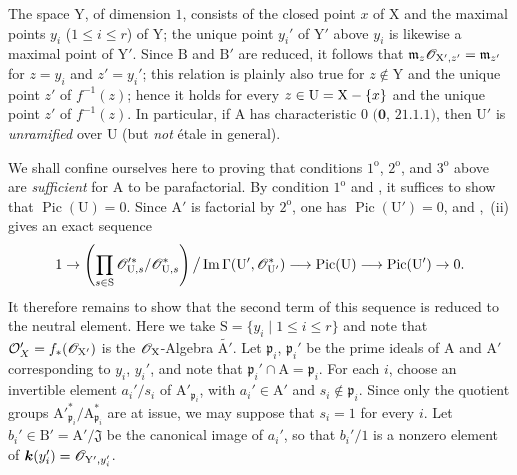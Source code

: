 \begin{env}[21.13.9]
The space $\mathrm{Y}$, of dimension $1$, consists of the closed point $x$ of $\mathrm{X}$ and the maximal points $y_i$ ($1\leq i\leq r$) of $\mathrm{Y}$; the unique point $y_i'$ of $\mathrm{Y}'$ above $y_i$ is likewise a maximal point of $\mathrm{Y}'$. Since $\mathrm{B}$ and $\mathrm{B}'$ are reduced, it follows that $\mathfrak{m}_z\mathscr{O}_{\mathrm{X}',z'}=\mathfrak{m}_{z'}$ for $z=y_i$ and $z'=y_i'$; this relation is plainly also true for $z\notin\mathrm{Y}$ and the unique point $z'$ of $f^{-1}(z)$; hence it holds for every $z\in\mathrm{U}=\mathrm{X}-\{x\}$ and the unique point $z'$ of $f^{-1}(z)$. In particular, if $\mathrm{A}$ has characteristic $0$ $(\mathbf{0}$, $21.1.1)$, then $\mathrm{U}'$ is \emph{unramified} over $\mathrm{U}$ (but \emph{not} \'etale in general).

We shall confine ourselves here to proving that conditions $1^{\mathrm{o}}$, $2^{\mathrm{o}}$, and $3^{\mathrm{o}}$ above are \emph{sufficient} for $\mathrm{A}$ to be parafactorial. By condition $1^{\mathrm{o}}$ and , it suffices to show that $\operatorname{Pic}(\mathrm{U})=0$. Since $\mathrm{A}'$ is factorial by $2^{\mathrm{o}}$, one has $\operatorname{Pic}(\mathrm{U}')=0$, and ,~(ii) gives an exact sequence
\[
  1\to
  \left(\prod_{s\in\mathrm{S}} \mathscr{O}'^{*}_{\mathrm{U},s}/\mathscr{O}^*_{\mathrm{U},s}\right)
  \big/\operatorname{Im}\Gamma(\mathrm{U}',\mathscr{O}_{\mathrm{U}'}^*)
  \longrightarrow\operatorname{Pic}(\mathrm{U})\longrightarrow\operatorname{Pic}(\mathrm{U}')\to 0.
\]
It therefore remains to show that the second term of this sequence is reduced to the neutral element. Here we take $\mathrm{S}=\{y_i\mid 1\leq i\leq r\}$ and note that $\mathcal O'_X=f_*(\mathscr{O}_{\mathrm{X}'})$ is the $\mathscr{O}_{\mathrm{X}}$-Algebra $\widetilde{\mathrm{A}'}$. Let $\mathfrak{p}_i$, $\mathfrak{p}_i'$ be the prime ideals of $\mathrm{A}$ and $\mathrm{A}'$ corresponding to $y_i$, $y_i'$, and note that $\mathfrak{p}_i'\cap\mathrm{A}=\mathfrak{p}_i$. For each $i$, choose an invertible element $a_i'/s_i$ of $\mathrm{A}'_{\mathfrak{p}_i}$, with $a_i'\in\mathrm{A}'$ and $s_i\notin\mathfrak{p}_i$. Since only the quotient groups $\mathrm{A}'^*_{\mathfrak{p}_i}/\mathrm{A}^*_{\mathfrak{p}_i}$ are at issue, we may suppose that $s_i=1$ for every $i$. Let $b_i'\in\mathrm{B}'=\mathrm{A}'/\mathfrak{J}$ be the canonical image of $a_i'$, so that $b_i'/1$ is a nonzero element of $\boldsymbol{k}(y_i')=\mathscr{O}_{\mathrm{Y}',y_i'}$.


\end{env}
